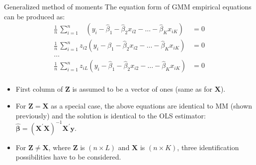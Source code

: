 \documentclass{beamer}
\begin{document}
\begin{frame}{Generalized method of moments}
The equation form of GMM empirical equations can be produced as:
\medskip
\footnotesize
\begin{equation*}
\begin{aligned}
\frac{1}{n}\, \sum_{i=1}^n ~~~~\left( y_i - \hat{\beta}_1 - \hat{\beta}_2 x_{i2} - \dots - \hat{\beta}_K x_{iK} \right) &= 0\\
\frac{1}{n}\, \sum_{i=1}^n  z_{i2} \left( y_i - \hat{\beta}_1 - \hat{\beta}_2 x_{i2} - \dots - \hat{\beta}_K x_{iK} \right) &= 0\\
\dots &\\
\frac{1}{n}\, \sum_{i=1}^n z_{iL} \left( y_i - \hat{\beta}_1 - \hat{\beta}_2 x_{i2} - \dots - \hat{\beta}_K x_{iK} \right) &= 0\\
\end{aligned}
\end{equation*}
\medskip
\begin{itemize}
    \item First column of $\bm{Z}$ is assumed to be a vector of ones (same as for $\bm{X}$).
    \smallskip
    \item For $\bm{Z}=\bm{X}$ as a special case, the above equations are identical to MM (shown previously) and the solution is identical to the OLS estimator: $\hat{\bm{\beta}}=(\bm{X}^{\prime}\bm{X})^{-1} \bm{X}^{\prime}\bm{y}$.
    \smallskip
    \item For $\bm{Z} \neq \bm{X}$, where $\bm{Z}$ is $(n\! \times \!L)$ and $\bm{X}$ is $(n \! \times \!K)$, three identification possibilities have to be considered. 
\end{itemize}
\end{frame}
\end{document}
